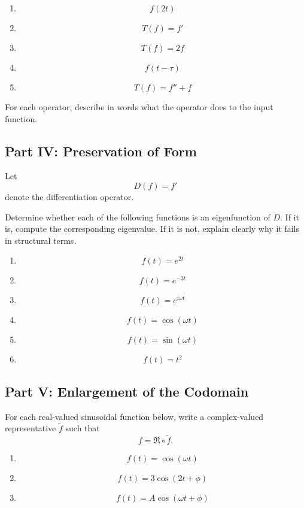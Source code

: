 \documentclass{article}
\begin{document}
	\begin{enumerate}
		\item
		\[
		f(2t)
		\]
		\item
		\[
		T(f)=f'
		\]
		\item
		\[
		T(f)=2f
		\]
		\item
		\[
		f(t-\tau)
		\]
		\item
		\[
		T(f)=f''+f
		\]
	\end{enumerate}
	
	For each operator, describe in words what the operator does to the input function.
	
	\subsection*{Part IV: Preservation of Form}
	
	Let
	\[
	D(f)=f'
	\]
	denote the differentiation operator.
	
	Determine whether each of the following functions is an eigenfunction of \(D\). If it is, compute the corresponding eigenvalue. If it is not, explain clearly why it fails in structural terms.
	
	\begin{enumerate}
		\item
		\[
		f(t)=e^{2t}
		\]
		\item
		\[
		f(t)=e^{-3t}
		\]
		\item
		\[
		f(t)=e^{i\omega t}
		\]
		\item
		\[
		f(t)=\cos(\omega t)
		\]
		\item
		\[
		f(t)=\sin(\omega t)
		\]
		\item
		\[
		f(t)=t^2
		\]
	\end{enumerate}
	
	\subsection*{Part V: Enlargement of the Codomain}
	
	For each real-valued sinusoidal function below, write a complex-valued representative \(\widetilde f\) such that
	\[
	f=\Re\circ \widetilde f.
	\]
	
	\begin{enumerate}
		\item
		\[
		f(t)=\cos(\omega t)
		\]
		\item
		\[
		f(t)=3\cos(2t+\phi)
		\]
		\item
		\[
		f(t)=A\cos(\omega t+\phi)
		\]
	\end{enumerate}
	
\end{document}

